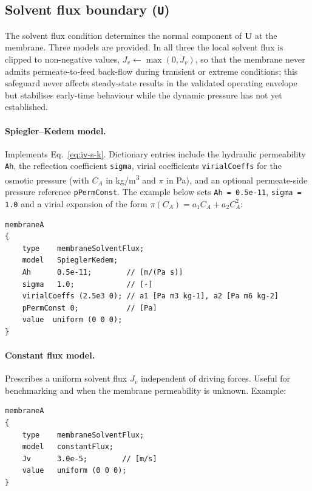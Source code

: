 \documentclass[11pt,a4paper]{article}
\begin{document}
\subsection{Solvent flux boundary (\texttt{U})}
\label{sec:bc-solvent}
The solvent flux condition determines the normal component of
\(\mathbf{U}\) at the membrane.  Three models are provided.  In all
three the local solvent flux is clipped to non-negative values,
\(J_v \leftarrow \max(0, J_v)\), so that the membrane never admits
permeate-to-feed back-flow during transient or extreme conditions;
this safeguard never affects steady-state results in the validated
operating envelope but stabilises early-time behaviour while the
dynamic pressure has not yet established.

\paragraph{Spiegler–Kedem model.}
Implements Eq.~\eqref{eq:jv-s-k}.  Dictionary entries include the
hydraulic permeability \texttt{Ah}, the reflection coefficient
\texttt{sigma}, virial coefficients \texttt{virialCoeffs} for the
osmotic pressure (with \(C_A\) in \si{kg/m^3} and \(\pi\) in
\si{Pa}), and an optional permeate-side pressure reference
\texttt{pPermConst}.  The example below sets
\texttt{Ah = 0.5e-11}, \texttt{sigma = 1.0} and a virial expansion
of the form \(\pi(C_A) = a_1 C_A + a_2 C_A^2\):

\begin{verbatim}
membraneA
{
    type    membraneSolventFlux;
    model   SpieglerKedem;
    Ah      0.5e-11;        // [m/(Pa s)]
    sigma   1.0;            // [-]
    virialCoeffs (2.5e3 0); // a1 [Pa m3 kg-1], a2 [Pa m6 kg-2]
    pPermConst 0;           // [Pa]
    value  uniform (0 0 0);
}
\end{verbatim}

\paragraph{Constant flux model.}
Prescribes a uniform solvent flux \(J_v\) independent of driving
forces.  Useful for benchmarking and when the membrane permeability is
unknown.  Example:
\begin{verbatim}
membraneA
{
    type    membraneSolventFlux;
    model   constantFlux;
    Jv      3.0e-5;        // [m/s]
    value   uniform (0 0 0);
}
\end{verbatim}
\end{document}
